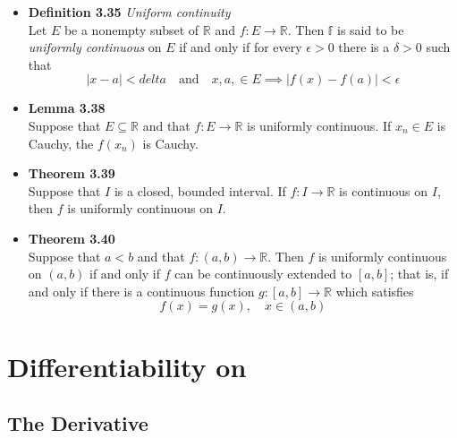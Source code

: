 \documentclass[11pt,a4paper]{article}
\begin{document}
\begin{itemize}

    \item \textbf{Definition 3.35} \emph{Uniform continuity} \\
        Let $E$ be a nonempty subset of $\mathbb{R}$ and $f : E \to \mathbb{R}$.
        Then $\mathbb{f}$ is said to be \emph{uniformly continuous} on $E$ if and only if
        for every $\epsilon > 0$ there is a $\delta > 0$ such that
        \[
            |x-a| < delta \quad \text{and} \quad x, a, \in E \implies |f(x) - f(a)| < \epsilon
        \]

    \item \textbf{Lemma 3.38} \\
        Suppose that $E \subseteq \mathbb{R}$ and that $f : E \to \mathbb{R}$
        is uniformly continuous.
        If $x_n \in E$ is Cauchy, the $f(x_n)$ is Cauchy.

    \item \textbf{Theorem 3.39} \\
        Suppose that $I$ is a closed, bounded interval.
        If $f : I \to \mathbb{R}$ is continuous on $I$, then $f$ is uniformly continuous on
        $I$.

    \item \textbf{Theorem 3.40} \\
        Suppose that $a < b$ and that $f : (a, b) \to \mathbb{R}$.
        Then $f$ is uniformly continuous on $(a, b)$ if and only if $f$ can be continuously
        extended to $[a, b]$; that is, if and only if there is a continuous function
        $g : [a, b] \to \mathbb{R}$ which satisfies
        \[
            f(x) = g(x), \quad x \in (a, b)
        \]
\end{itemize}

\break{}

\section{Differentiability on }

\subsection{The Derivative}
\end{document}

